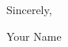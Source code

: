 \documentclass[a4paper,12pt]{article}
\begin{document}
\vspace{20pt}


Sincerely,

\vspace{30pt} %

Your Name

\end{document}
